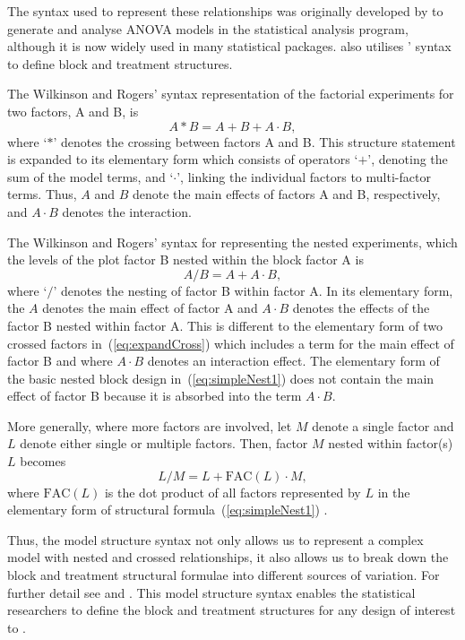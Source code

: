 \documentclass[article]{jss}
\begin{document}
The syntax used to represent these relationships was originally developed by \cite{Wilkinson1973} to generate and analyse ANOVA models in the  statistical analysis program, although it is now widely used in many statistical packages.  also utilises \citeauthor{Wilkinson1973}' syntax to define block and treatment structures.

The Wilkinson and Rogers' syntax representation of the factorial experiments for two factors, A and B, is
\begin{equation}\label{eq:expandCross}
A*B = A + B +A\cdot B,
\end{equation}
where `$*$' denotes the crossing between factors A and B. This structure statement is expanded to its elementary form which consists of operators `$+$', denoting the sum of the model terms, and `$\cdot$', linking the individual factors to multi-factor terms. Thus, $A$ and $B$ denote the main effects of factors A and B, respectively, and $A\cdot B$ denotes the interaction. 

The Wilkinson and Rogers' syntax for representing the nested experiments, which the levels of the plot factor B nested within the block factor A is
\begin{equation} \label{eq:simpleNest1}
A/B = A + A\cdot B,
\end{equation}
where `$/$' denotes the nesting of factor B within factor A. In its elementary form, the $A$ denotes the main effect of factor A and $A\cdot B$ denotes the effects of the factor B nested within factor A. This is different to the elementary form of two crossed factors in~(\ref{eq:expandCross}) which includes a term for the main effect of factor B and where $A\cdot B$ denotes an interaction effect. The elementary form of the basic nested block design in~(\ref{eq:simpleNest1}) does not contain the main effect of factor B because it is absorbed into the term $A\cdot B$.

More generally, where more factors are involved, let $M$ denote a single factor and $L$ denote either single or multiple factors. Then, factor $M$ nested within factor(s) $L$ becomes
\[ L/M = L + \mathrm{FAC}(L) \cdot M, \]
where $\mathrm{FAC}(L)$ is the dot product of all factors represented by $L$ in the elementary form of structural formula~(\ref{eq:simpleNest1}) \citep{Wilkinson1973}.

Thus, the model structure syntax not only allows us to represent a complex model with nested and crossed relationships, it also allows us to break down the block and treatment structural formulae into different sources of variation. For further detail see \cite{Wilkinson1973} and \cite{Nelder1965A}. This model structure syntax enables the statistical researchers to define the block and treatment structures for any design of interest to .
\end{document}

